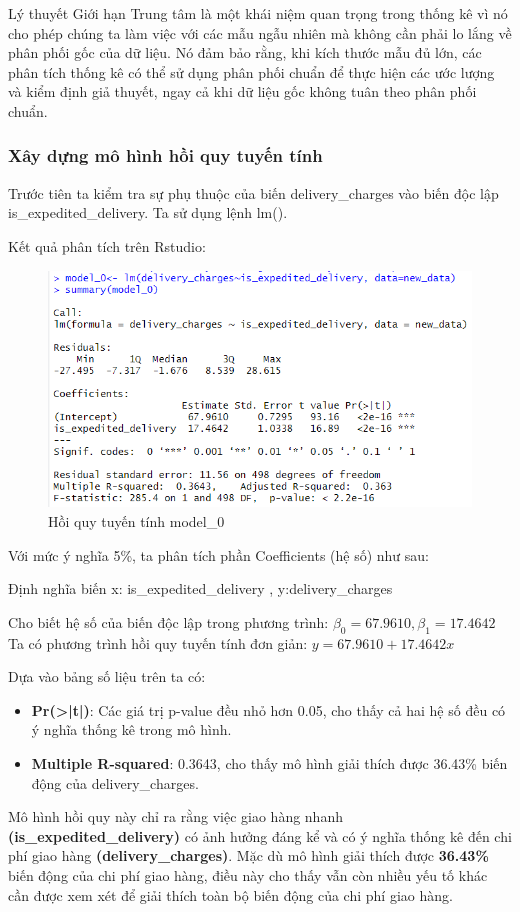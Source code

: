 Lý thuyết Giới hạn Trung tâm là một khái niệm quan trọng trong thống kê vì nó cho phép chúng ta làm việc với các mẫu ngẫu nhiên mà không cần phải lo lắng về phân phối gốc của dữ liệu. Nó đảm bảo rằng, khi kích thước mẫu đủ lớn, các phân tích thống kê có thể sử dụng phân phối chuẩn để thực hiện các ước lượng và kiểm định giả thuyết, ngay cả khi dữ liệu gốc không tuân theo phân phối chuẩn.
\subsubsection{Xây dựng mô hình hồi quy tuyến tính}
Trước tiên ta kiểm tra sự phụ thuộc của biến delivery\_charges vào biến độc lập is\_expedited\_delivery. Ta sử dụng lệnh lm().

Kết quả phân tích trên Rstudio:
\begin{figure}[ht]
  \centering
  \includegraphics[width=0.7\linewidth]{graphics/5.5.1.png}
  \caption{Hồi quy tuyến tính model\_0 }
\end{figure}
\newpage

Với mức ý nghĩa 5\%, ta phân tích phần Coefficients (hệ số) như sau:

Định nghĩa biến x: is\_expedited\_delivery
, y:delivery\_charges

Cho biết hệ số của biến độc lập trong phương trình: $\beta_0= 67.9610, \beta_1= 17.4642 $
 Ta có phương trình hồi quy tuyến tính đơn giản: $y= 67.9610 + 17.4642x$

 Dựa vào bảng số liệu trên ta có:\\
 \begin{itemize}
 \item\textbf{Pr(>|t|)}: Các giá trị p-value đều nhỏ hơn 0.05, cho thấy cả hai hệ số đều có ý nghĩa thống kê trong mô hình.
\item\textbf{Multiple R-squared}: 0.3643, cho thấy mô hình giải thích được 36.43\% biến động của delivery\_charges.
 \end{itemize}

 Mô hình hồi quy này chỉ ra rằng việc giao hàng nhanh \textbf{(is\_expedited\_delivery)} có ảnh hưởng đáng kể và có ý nghĩa thống kê đến chi phí giao hàng \textbf{(delivery\_charges)}. Mặc dù mô hình giải thích được \textbf{36.43\%} biến động của chi phí giao hàng, điều này cho thấy vẫn còn nhiều yếu tố khác cần được xem xét để giải thích toàn bộ biến động của chi phí giao hàng.


